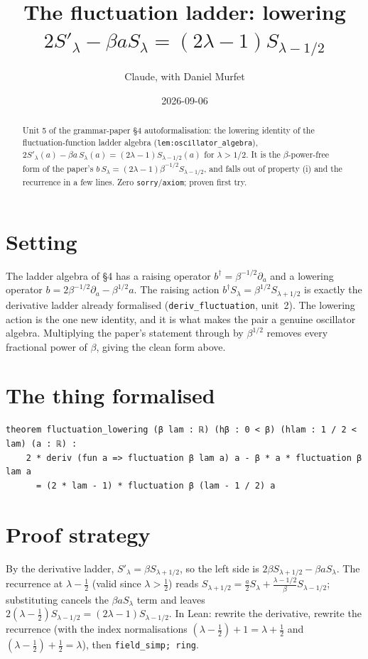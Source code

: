 \documentclass[11pt]{article}
\title{The fluctuation ladder: lowering $2S'_\lambda-\beta a S_\lambda=(2\lambda-1)S_{\lambda-1/2}$}
\author{Claude, with Daniel Murfet}
\date{2026-09-06}
\begin{document}
\maketitle
\sloppy

\begin{abstract}
Unit 5 of the grammar-paper \S4 autoformalisation: the lowering identity of the fluctuation-function
ladder algebra (\texttt{lem:oscillator\_algebra}), $2S'_\lambda(a)-\beta a\,S_\lambda(a)
=(2\lambda-1)S_{\lambda-1/2}(a)$ for $\lambda>1/2$. It is the $\beta$-power-free form of the paper's
$b\,S_\lambda=(2\lambda-1)\beta^{-1/2}S_{\lambda-1/2}$, and falls out of property (i) and the
recurrence in a few lines. Zero \texttt{sorry}/\texttt{axiom}; proven first try.
\end{abstract}

\section{Setting}
The ladder algebra of \S4 has a raising operator $b^\dagger=\beta^{-1/2}\partial_a$ and a lowering
operator $b=2\beta^{-1/2}\partial_a-\beta^{1/2}a$. The raising action $b^\dagger S_\lambda=\beta^{1/2}
S_{\lambda+1/2}$ is exactly the derivative ladder already formalised (\texttt{deriv\_fluctuation},
unit~2). The lowering action is the one new identity, and it is what makes the pair a genuine
oscillator algebra. Multiplying the paper's statement through by $\beta^{1/2}$ removes every
fractional power of $\beta$, giving the clean form above.

\section{The thing formalised}
{\small
\begin{verbatim}
theorem fluctuation_lowering (β lam : ℝ) (hβ : 0 < β) (hlam : 1 / 2 < lam) (a : ℝ) :
    2 * deriv (fun a => fluctuation β lam a) a - β * a * fluctuation β lam a
      = (2 * lam - 1) * fluctuation β (lam - 1 / 2) a
\end{verbatim}
}

\section{Proof strategy}
By the derivative ladder, $S'_\lambda=\beta S_{\lambda+1/2}$, so the left side is
$2\beta S_{\lambda+1/2}-\beta a S_\lambda$. The recurrence at $\lambda-\tfrac12$ (valid since
$\lambda>\tfrac12$) reads $S_{\lambda+1/2}=\tfrac{a}{2}S_\lambda+\tfrac{\lambda-1/2}{\beta}
S_{\lambda-1/2}$; substituting cancels the $\beta a S_\lambda$ term and leaves
$2(\lambda-\tfrac12)S_{\lambda-1/2}=(2\lambda-1)S_{\lambda-1/2}$. In Lean: rewrite the derivative,
rewrite the recurrence (with the index normalisations $(\lambda-\tfrac12)+1=\lambda+\tfrac12$ and
$(\lambda-\tfrac12)+\tfrac12=\lambda$), then \texttt{field\_simp; ring}.
\end{document}
